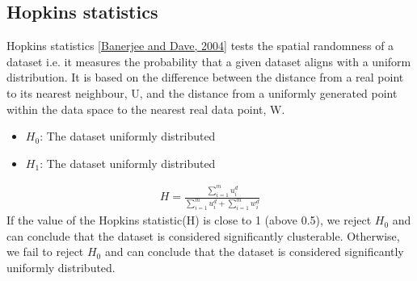 \documentclass[letterpaper,10pt,english]{jupyterBook}
\begin{document}
\subsection{Hopkins statistics}
\label{\detokenize{Clustering_Analysis:hopkins-statistics}}
\sphinxAtStartPar
Hopkins statistics {[}\hyperlink{cite.References:id7}{Banerjee and Dave, 2004}{]} tests the spatial randomness of a dataset i.e. it measures the probability that a given dataset aligns with a uniform distribution. It is based on the difference between the distance from a real point to its nearest neighbour, U, and the distance from a uniformly generated point within the data space to the nearest real data point, W.
\begin{itemize}
\item {} 
\sphinxAtStartPar
\(H_{0}\): The dataset  uniformly distributed

\item {} 
\sphinxAtStartPar
\(H_{1}\): The dataset  uniformly distributed

\end{itemize}
\begin{equation*}
\begin{split}
H = \frac{\sum_{i=1}^{m} u_{i}^{d}}{\sum_{i=1}^{m} u_{i}^{d} + \sum_{i=1}^{m} w_{i}^{d}}
\end{split}
\end{equation*}
\sphinxAtStartPar
If the value of the Hopkins statistic(H) is close to 1 (above 0.5), we reject \(H_{0}\) and can conclude that the dataset is considered significantly clusterable.  Otherwise, we fail to reject \(H_{0}\) and can conclude that the dataset is considered significantly uniformly distributed.
\end{document}

